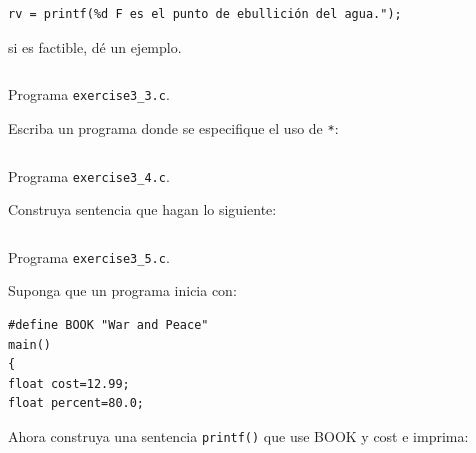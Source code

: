 \documentclass[spanish,addpoints,answers,a4paper]{exam}
\begin{document}
\begin{questions}
\begin{verbatim}
rv = printf(%d F es el punto de ebullición del agua.");
\end{verbatim}

si es factible, dé un ejemplo.

\begin{solution}
\begin{listing}[H]
\footnotesize
\inputminted{c}{exercise3_3.c}
\caption{Programa \texttt{exercise3\_3.c}.}
\label{lst:3.3}
\end{listing}
\end{solution}

\question Escriba un programa donde se especifique el uso de \texttt{*}:

\begin{solution}
\begin{listing}[H]
\footnotesize
\inputminted{c}{exercise3_4.c}
\caption{Programa \texttt{exercise3\_4.c}.}
\label{lst:3.4}
\end{listing}
\end{solution}

\question Construya sentencia que hagan lo siguiente:


\begin{solution}
\begin{listing}[H]
\footnotesize
\inputminted{c}{exercise3_5.c}
\caption{Programa \texttt{exercise3\_5.c}.}
\label{lst:3.5}
\end{listing}
\end{solution}

\question Suponga que un programa inicia con:

\begin{verbatim}
#define BOOK "War and Peace"
main()
{
float cost=12.99;
float percent=80.0;
\end{verbatim}

Ahora construya una sentencia \texttt{printf()} que use BOOK y cost e imprima:


\end{questions}
\end{document}
